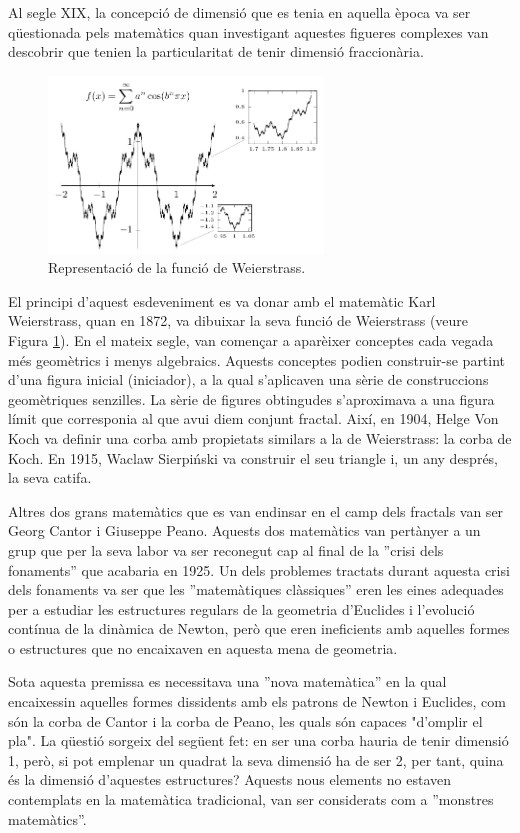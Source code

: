 \documentclass[12pt,a4paper]{report}
\begin{document}
Al segle XIX, la concepció de dimensió que es tenia en aquella època va ser qüestionada pels matemàtics quan investigant aquestes figueres complexes van descobrir que tenien la particularitat de tenir dimensió fraccionària.
\begin{figure}[!ht]
\centering
\includegraphics[width=0.65\textwidth]{img/img01_02_weierstrass}
\caption{Representació de la funció de Weierstrass.}
\label{img01_02}
\end{figure}
El principi d’aquest esdeveniment es va donar amb el matemàtic Karl Weierstrass, quan en 1872, va dibuixar la seva funció de Weierstrass (veure Figura \ref{img01_02}). En el mateix segle, van començar a aparèixer conceptes cada vegada més geomètrics i menys algebraics. Aquests conceptes podien construir-se partint d'una figura inicial (iniciador), a la qual s'aplicaven una sèrie de construccions geomètriques senzilles. La sèrie de figures obtingudes s'aproximava a una figura límit que corresponia al que avui diem conjunt fractal. Així, en 1904, Helge Von Koch va definir una corba amb propietats similars a la de Weierstrass: la corba de Koch. En 1915, Waclaw Sierpiński va construir el seu triangle i, un any després, la seva catifa.

Altres dos grans matemàtics que es van endinsar en el camp dels fractals van ser Georg Cantor i Giuseppe Peano. Aquests dos matemàtics van pertànyer a un grup que per la seva labor va ser reconegut cap al final de la ''crisi dels fonaments'' que acabaria en 1925. Un dels problemes tractats durant aquesta crisi dels fonaments va ser que les ''matemàtiques clàssiques'' eren les eines adequades per a estudiar les estructures regulars de la geometria d'Euclides i l'evolució contínua de la dinàmica de Newton, però que eren ineficients amb aquelles formes o estructures que no encaixaven en aquesta mena de geometria.

Sota aquesta premissa es necessitava una ''nova matemàtica'' en la qual encaixessin aquelles formes dissidents amb els patrons de Newton i Euclides, com són la corba de Cantor i la corba de Peano, les quals són capaces "d'omplir el pla". La qüestió sorgeix del següent fet: en ser una corba hauria de tenir dimensió 1, però, si pot emplenar un quadrat la seva dimensió ha de ser 2, per tant, quina és la dimensió d'aquestes estructures? Aquests nous elements no estaven contemplats en la matemàtica tradicional, van ser considerats com a ''monstres matemàtics''.
\end{document}
